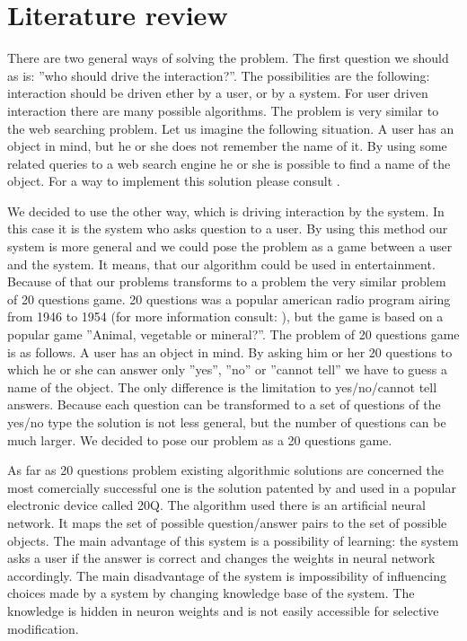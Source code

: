 \documentclass[a4paper]{article}
\begin{document}
\section{Literature review}
There are two general ways of solving the problem. The first question we should as is: ''who should drive the interaction?''. The possibilities are the following: interaction should be driven ether by a user, or by a system. For user driven interaction there are many possible algorithms. The problem is very similar to the web searching problem. Let us imagine the following situation. A user has an object in mind, but he or she does not remember the name of it. By using some related queries to a web search engine he or she is possible to find a name of the object. For a way to implement this solution please consult \citet{Google}.

We decided to use the other way, which is driving interaction by the system. In this case it is the system who asks question to a user. By using this method our system is more general and we could pose the problem as a game between a user and the system. It means, that our algorithm could be used in entertainment. Because of that our problems transforms to a problem the very similar problem of 20 questions game. 20 questions was a popular american radio program airing from 1946 to 1954 (for more information consult: \citet{Radio}), but the game is based on a popular game ''Animal, vegetable or mineral?''. The problem of 20 questions game is as follows. A user has an object in mind. By asking him or her 20 questions to which he or she can answer only ''yes'', ''no'' or ''cannot tell'' we have to guess a name of the object. The only difference is the limitation to yes/no/cannot tell answers. Because each question can be transformed to a set of questions of the yes/no type the solution is not less general, but the number of questions can be much larger. We decided to pose our problem as a 20 questions game. 

As far as 20 questions problem existing algorithmic solutions are concerned the most comercially successful one is the solution patented by \citet{20Q} and used in a popular electronic device called 20Q. The algorithm used there is an artificial neural network. It maps the set of possible question/answer pairs to the set of possible objects. The main advantage of this system is a possibility of learning: the system asks a user if the answer is correct and changes the weights in neural network accordingly. The main disadvantage of the system is impossibility of influencing choices made by a system by changing knowledge base of the system. The knowledge is hidden in neuron weights and is not easily accessible for selective modification.
\end{document}
